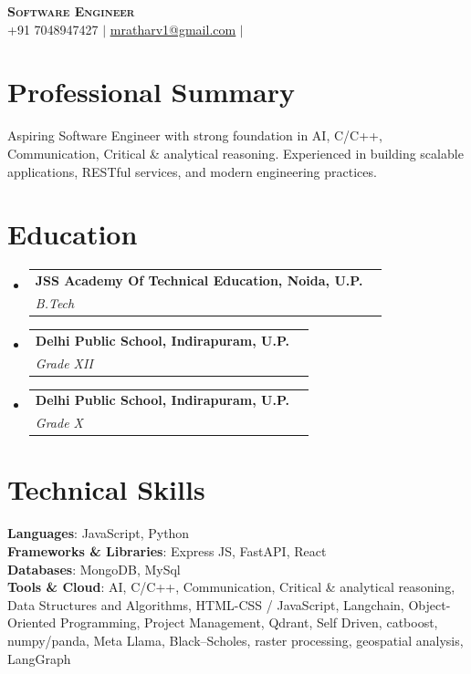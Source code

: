 \documentclass[letterpaper,10pt]{article}
\makeatletter
\newcommand{\resumeSubheading}[4]{
  \vspace{-2pt}\item
    \begin{tabular*}{0.97\textwidth}[t]{l@{\extracolsep{\fill}}r}
      \textbf{#1} & #2 \\
      \textit{\small#3} & \textit{\small #4} \\
    \end{tabular*}\vspace{-7pt}
}
\newcommand{\resumeSubHeadingListStart}{\begin{itemize}[leftmargin=0.15in, label={}]}
\newcommand{\resumeSubHeadingListEnd}{\end{itemize}}
\makeatother
\begin{document}
\begin{center}
    \textbf{\Huge \scshape Software Engineer} \\ \vspace{2pt}
    \small 
    +91 7048947427 $|$     \href{mailto:mratharv1@gmail.com}{\underline{mratharv1@gmail.com}} $|$             \end{center}

\section{Professional Summary}
\small{Aspiring Software Engineer with strong foundation in AI, C/C++, Communication, Critical \& analytical reasoning. Experienced in building scalable applications, RESTful services, and modern engineering practices.}
\vspace{2pt}

\section{Education}
  \resumeSubHeadingListStart
          \resumeSubheading
        {JSS Academy Of Technical Education, Noida, U.P.}{}
        {B.Tech}{}
          \resumeSubheading
        {Delhi Public School, Indirapuram, U.P.}{}
        {Grade XII}{}
          \resumeSubheading
        {Delhi Public School, Indirapuram, U.P.}{}
        {Grade X}{}
      \resumeSubHeadingListEnd

\section{Technical Skills}
 \begin{itemize}[leftmargin=0.15in, label={}]
    \small{\item{
                        \textbf{Languages}: JavaScript, Python \\
                                \textbf{Frameworks & Libraries}: Express JS, FastAPI, React \\
                                \textbf{Databases}: MongoDB, MySql \\
                                \textbf{Tools & Cloud}: AI, C/C++, Communication, Critical \& analytical reasoning, Data Structures and Algorithms, HTML-CSS / JavaScript, Langchain, Object-Oriented Programming, Project Management, Qdrant, Self Driven, catboost, numpy/panda, Meta Llama, Black–Scholes, raster processing, geospatial analysis, LangGraph \\
                                }}
 \end{itemize}
\end{document}
